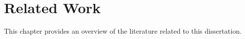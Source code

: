\chapter{Related Work}
\label{chap:related-work}

This chapter provides an overview of the literature related to this dissertation.


